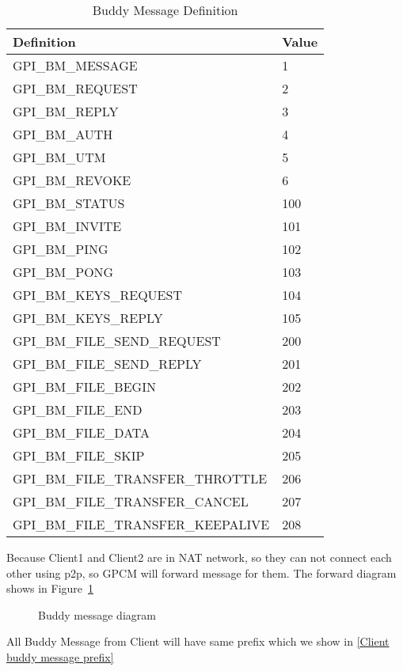\documentclass[oneside,titlepage,a4paper]{Definition/retrospy} %
\begin{document}
\begin{table}[H]
	\centering
	\begin{tabular}{|l|l|}
		\hline 
		\textbf{Definition}&\textbf{Value} \\ 
		\hline 
 GPI\_BM\_MESSAGE&            1\\\hline
 GPI\_BM\_REQUEST     &               2\\\hline
 GPI\_BM\_REPLY        &            3  \\\hline
 GPI\_BM\_AUTH        &             4\\\hline
 GPI\_BM\_UTM            &            5\\\hline
 GPI\_BM\_REVOKE      &               6 \\\hline
 GPI\_BM\_STATUS       &          100			\\\hline			
 GPI\_BM\_INVITE           &       101\\\hline
 GPI\_BM\_PING             &      102\\\hline
 GPI\_BM\_PONG           &          103\\\hline
 GPI\_BM\_KEYS\_REQUEST        &    104\\\hline
 GPI\_BM\_KEYS\_REPLY            &   105\\\hline
 GPI\_BM\_FILE\_SEND\_REQUEST   &  200\\\hline
 GPI\_BM\_FILE\_SEND\_REPLY      &   201\\\hline
 GPI\_BM\_FILE\_BEGIN       &      202\\\hline
 GPI\_BM\_FILE\_END             &   203\\\hline
 GPI\_BM\_FILE\_DATA             & 204\\\hline
 GPI\_BM\_FILE\_SKIP          &      205\\\hline
 GPI\_BM\_FILE\_TRANSFER\_THROTTLE   &206\\\hline
 GPI\_BM\_FILE\_TRANSFER\_CANCEL&     207\\\hline
 GPI\_BM\_FILE\_TRANSFER\_KEEPALIVE &208\\\hline
	\end{tabular} 
	\caption{Buddy Message Definition}
	\label{Buddy Message Definition}
\end{table}
Because Client1 and Client2 are in NAT network, so they can not connect each other using p2p, so GPCM will forward message for them. The forward diagram shows in Figure~\ref{Buddy message diagram}
\begin{figure}[H]
	\centering
	\caption{Buddy message diagram}
	\label{Buddy message diagram}
\end{figure}
All Buddy Message from Client will have same prefix which we show in \ref{Client buddy message prefix}
\end{document}
